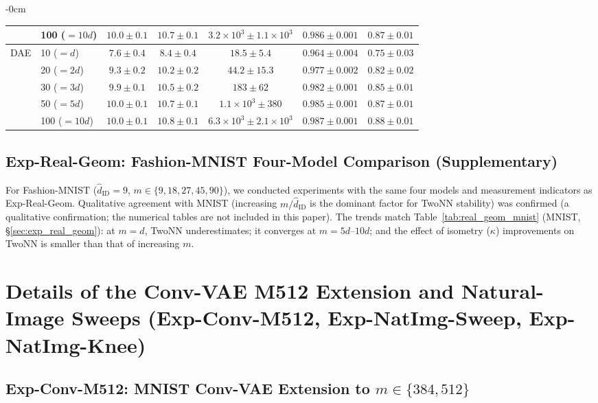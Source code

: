 \documentclass[make,article,submit,pdftex,moreauthors]{Definitions/mdpi}
\newcommand{\kap}{\kappa}
\begin{document}
\begin{table}[H]
\begin{adjustwidth}{-\extralength}{0cm}
\begin{tabular}{llccccc}
 & 100 ($=10d$) & $10.0\pm0.1$ & $10.7\pm0.1$ & $3.2\times10^3\pm 1.1\times10^3$ & $0.986\pm0.001$ & $0.87\pm0.01$ \\
\midrule
\multirow{5}{*}{DAE}
 & 10 ($=d$)    & $7.6\pm0.4$ & $8.4\pm0.4$ & $18.5\pm5.4$ & $0.964\pm0.004$ & $0.75\pm0.03$ \\
 & 20 ($=2d$)   & $9.3\pm0.2$ & $10.2\pm0.2$ & $44.2\pm15.3$ & $0.977\pm0.002$ & $0.82\pm0.02$ \\
 & 30 ($=3d$)   & $9.9\pm0.1$ & $10.5\pm0.2$ & $183\pm62$ & $0.982\pm0.001$ & $0.85\pm0.01$ \\
 & 50 ($=5d$)   & $10.0\pm0.1$ & $10.7\pm0.1$ & $1.1\times10^3\pm 380$ & $0.985\pm0.001$ & $0.87\pm0.01$ \\
 & 100 ($=10d$) & $10.0\pm0.1$ & $10.8\pm0.1$ & $6.3\times10^3\pm 2.1\times10^3$ & $0.987\pm0.001$ & $0.88\pm0.01$ \\
\bottomrule
\end{tabular}
\end{adjustwidth}
\end{table}

\subsection*{Exp-Real-Geom: Fashion-MNIST Four-Model Comparison (Supplementary)}

For Fashion-MNIST ($\hat{d}_\mathrm{ID}=9$, $m \in \{9,18,27,45,90\}$),
we conducted experiments with the same four models and measurement indicators as Exp-Real-Geom.
Qualitative agreement with MNIST (increasing $m/\hat{d}_\mathrm{ID}$ is the dominant factor for TwoNN stability)
was confirmed (a qualitative confirmation; the numerical tables are not included in this paper).
The trends match Table~\ref{tab:real_geom_mnist} (MNIST, \S\ref{sec:exp_real_geom}):
at $m = d$, TwoNN underestimates; it converges at $m = 5d$--$10d$;
and the effect of isometry ($\kap$) improvements on TwoNN is smaller than that of increasing $m$.

\section[\appendixname~\thesection]{Details of the Conv-VAE M512 Extension and Natural-Image Sweeps (Exp-Conv-M512, Exp-NatImg-Sweep, Exp-NatImg-Knee)}\label{app:convvae_natimg}

\subsection*{Exp-Conv-M512: MNIST Conv-VAE Extension to $m \in \{384, 512\}$}
\end{document}
